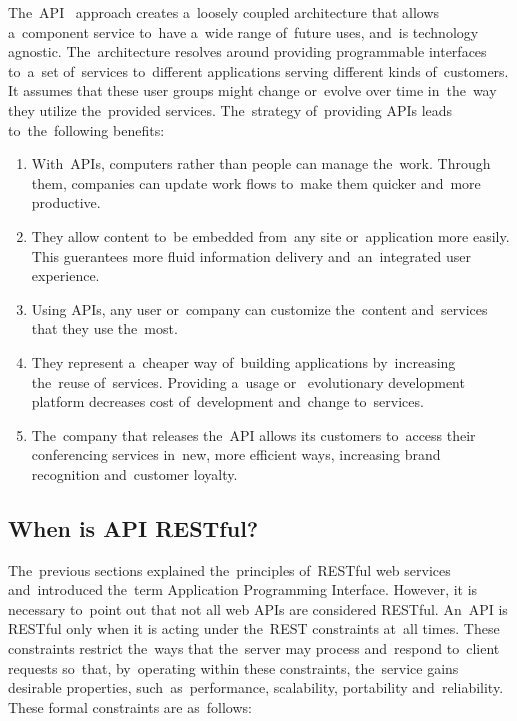 The~API~\cite{RESTfulAPI} approach creates a~loosely coupled architecture that
allows a~component service to~have a~wide range of~future uses, and~is
technology agnostic. The~architecture resolves around providing programmable
interfaces to~a~set of~services to~different applications serving different
kinds of~customers. It assumes that these user groups might change or~evolve
over time in~the~way they utilize the~provided services. The~strategy
of~providing APIs leads to~the~following benefits:

\begin{enumerate}
  \item With~APIs, computers rather than people can manage the~work. Through
  them, companies can update work flows to~make them quicker and~more
  productive.
  \item They allow content to~be embedded from~any site or~application more
  easily. This guerantees more fluid information delivery and~an~integrated user
  experience.
  \item Using APIs, any user or~company can customize the~content and~services
  that they use the~most.
  \item They represent a~cheaper way of~building applications by~increasing
  the~reuse of~services. Providing a~usage or~ evolutionary
  development platform decreases cost of~development and~change to~services.
  \item The~company that releases the~API allows its customers to~access their
  conferencing services in~new, more efficient ways, increasing brand
  recognition and~customer loyalty.
\end{enumerate}



\subsection{When is API RESTful?}
The~previous sections explained the~principles of~RESTful web services
and~introduced the~term Application Programming Interface. However, it is
necessary to~point out that not all web APIs are considered RESTful. An~API is
RESTful only when it is acting under the~REST constraints at~all times. These
constraints restrict the~ways that the~server may process and~respond to~client
requests so~that, by~operating within these constraints, the~service gains
desirable  properties, such~as~performance, scalability,
portability and~reliability. These formal constraints are as~follows:

